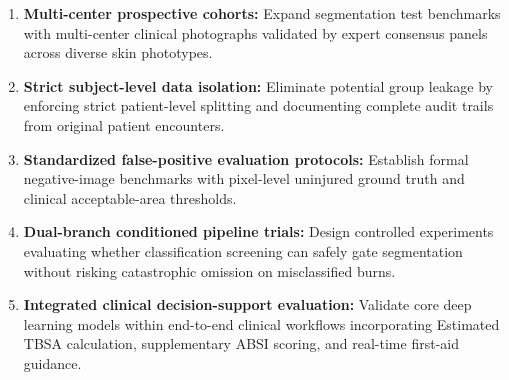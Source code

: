 \documentclass[11pt,a4paper]{article}
\begin{document}
\begin{enumerate}
  \item \textbf{Multi-center prospective cohorts:} Expand segmentation test benchmarks with multi-center clinical photographs validated by expert consensus panels across diverse skin phototypes.
  \item \textbf{Strict subject-level data isolation:} Eliminate potential group leakage by enforcing strict patient-level splitting and documenting complete audit trails from original patient encounters.
  \item \textbf{Standardized false-positive evaluation protocols:} Establish formal negative-image benchmarks with pixel-level uninjured ground truth and clinical acceptable-area thresholds.
  \item \textbf{Dual-branch conditioned pipeline trials:} Design controlled experiments evaluating whether classification screening can safely gate segmentation without risking catastrophic omission on misclassified burns.
  \item \textbf{Integrated clinical decision-support evaluation:} Validate core deep learning models within end-to-end clinical workflows incorporating Estimated TBSA calculation, supplementary ABSI scoring, and real-time first-aid guidance.
\end{enumerate}
\end{document}
